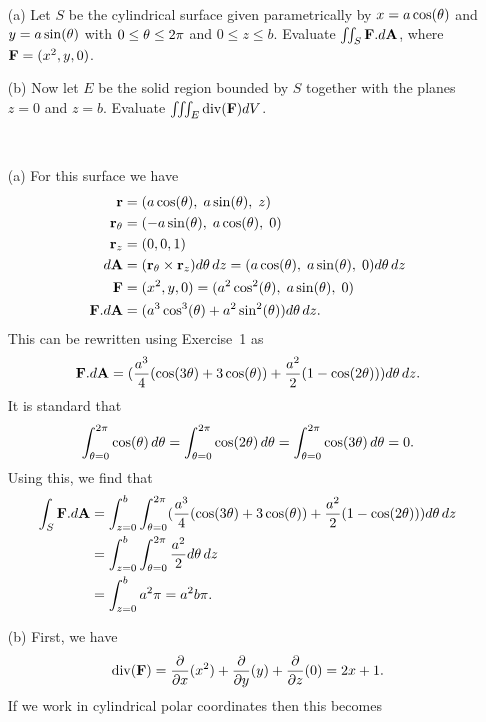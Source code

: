 \documentclass[a4paper]{amsart}
\renewenvironment{solution}{\SolutionInline}{\endSolutionInline}
\begin{document}
\begin{exercise}\ \\[-3ex]
 \begin{itemize}
  \item[(a)] Let $S$ be the cylindrical surface given parametrically
   by $x=a\cos(\theta)$ and $y=a\sin(\theta)$ with $0\leq\theta\leq 2\pi$
   and $0\leq z\leq b$.  Evaluate $\iint_S\mathbf{F}.d\mathbf{A}$, where
   $\mathbf{F}=(x^2,y,0)$.
  \item[(b)] Now let $E$ be the solid region bounded by $S$ together
   with the planes $z=0$ and $z=b$.  Evaluate $\iiint_E\operatorname{div}(\mathbf{F})dV$.
 \end{itemize}
\end{exercise}
\begin{solution}\ \\[-3ex]
 \begin{itemize}
  \item[(a)] For this surface we have
   \begin{align*}
    \mathbf{r} &= (a\cos(\theta),\;a\sin(\theta),\;z) \\
    \mathbf{r}_\theta &= (-a\sin(\theta),\;a\cos(\theta),\;0) \\
    \mathbf{r}_z &= (0,0,1) \\
    d\mathbf{A} &= (\mathbf{r}_\theta\times\mathbf{r}_z)d\theta\,dz 
     = (a\cos(\theta),\;a\sin(\theta),\;0)d\theta\,dz  \\
    \mathbf{F} &= (x^2,y,0) = (a^2\cos^2(\theta),\;a\sin(\theta),\;0) \\
    \mathbf{F}.d\mathbf{A} &= (a^3\cos^3(\theta)+a^2\sin^2(\theta))d\theta\,dz.
   \end{align*}
   This can be rewritten using Exercise~1 as 
   \[ \mathbf{F}.d\mathbf{A} = (\frac{a^3}{4}(\cos(3\theta)+3\cos(\theta)) +
                  \frac{a^2}{2}(1-\cos(2\theta)))d\theta\,dz.
   \]
   It is standard that 
   \[ \int_{\theta=0}^{2\pi}\cos(\theta)\,d\theta = 
      \int_{\theta=0}^{2\pi}\cos(2\theta)\,d\theta = 
      \int_{\theta=0}^{2\pi}\cos(3\theta)\,d\theta = 0.
   \]
   Using this, we find that
   \begin{align*}
    \int_S \mathbf{F}.d\mathbf{A} 
     &= \int_{z=0}^b \int_{\theta=0}^{2\pi}
         (\frac{a^3}{4}(\cos(3\theta)+3\cos(\theta)) +
                  \frac{a^2}{2}(1-\cos(2\theta)))d\theta\,dz \\
     &= \int_{z=0}^b \int_{\theta=0}^{2\pi}\frac{a^2}{2} d\theta\,dz \\
     &= \int_{z=0}^b a^2\pi = a^2b\pi.
   \end{align*}
  \item[(b)] First, we have
   \[ \operatorname{div}(\mathbf{F}) = \frac{\partial}{\partial x}(x^2)+\frac{\partial}{\partial y}(y)+\frac{\partial}{\partial z}(0) = 2x+1. \]
   If we work in cylindrical polar coordinates then this becomes

\end{itemize}
\end{solution}
\end{document}
